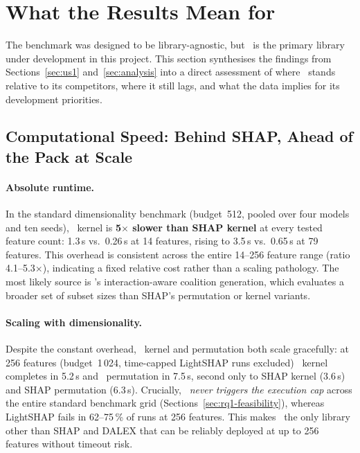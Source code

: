 
\section{What the Results Mean for \shapiq}
\label{sec:shapiq-position}

The benchmark was designed to be library-agnostic, but \shapiq\ is the
primary library under development in this project.
This section synthesises the findings from
Sections~\ref{sec:us1} and~\ref{sec:analysis} into a direct assessment of
where \shapiq\ stands relative to its competitors, where it still lags,
and what the data implies for its development priorities.

\subsection{Computational Speed: Behind SHAP, Ahead of the Pack at Scale}
\label{sec:shapiq-speed}

\paragraph{Absolute runtime.}
In the standard dimensionality benchmark (budget~512, pooled over four
models and ten seeds), \shapiq\ kernel is \textbf{5$\times$ slower than
SHAP kernel} at every tested feature count: 1.3\,s vs.\ 0.26\,s at 14
features, rising to 3.5\,s vs.\ 0.65\,s at 79 features.
This overhead is consistent across the entire 14--256 feature range
(ratio 4.1--5.3$\times$), indicating a fixed relative cost rather than a
scaling pathology.
The most likely source is \shapiq's interaction-aware coalition generation,
which evaluates a broader set of subset sizes than SHAP's permutation or
kernel variants.

\paragraph{Scaling with dimensionality.}
Despite the constant overhead, \shapiq\ kernel and permutation both scale
gracefully: at 256 features (budget~1\,024, time-capped LightSHAP runs
excluded) \shapiq\ kernel completes in 5.2\,s and \shapiq\ permutation in
7.5\,s, second only to SHAP kernel (3.6\,s) and SHAP permutation
(6.3\,s).
Crucially, \shapiq\ \emph{never triggers the execution cap} across the
entire standard benchmark grid (Sections~\ref{sec:rq1-feasibility}), whereas
LightSHAP fails in 62--75\,\% of runs at 256 features.
This makes \shapiq\ the only library other than SHAP and DALEX that can be
reliably deployed at up to 256 features without timeout risk.

